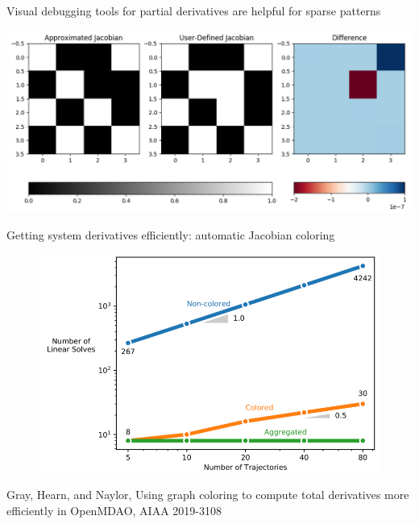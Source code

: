 \documentclass[aspectratio=169, usenames, dvipsnames, 14pt]{beamer}
\begin{document}
\begin{frame}{Visual debugging tools for partial derivatives are helpful for sparse patterns}
	
	\includegraphics[scale=.5]{images/slide_56_derivatives.png}

\end{frame}     

\begin{frame}{Getting system derivatives efficiently: automatic Jacobian coloring}

	\begin{figure}
		\includegraphics[scale=.36]{images/slide_57_derivatives.png}
	\end{figure}
	Gray, Hearn, and Naylor, Using graph coloring to compute total derivatives more efficiently in OpenMDAO, AIAA 2019-3108
	
\end{frame}
\end{document}
